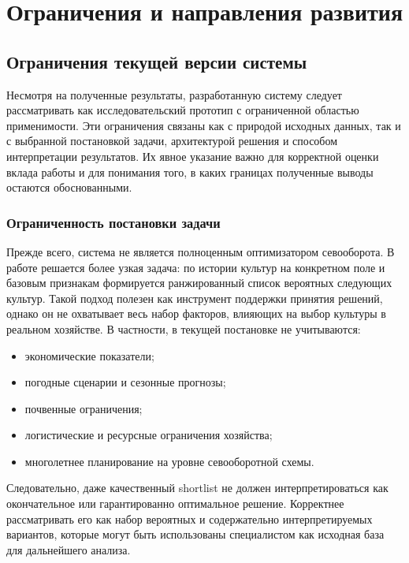 \section{Ограничения и направления развития}

\subsection{Ограничения текущей версии системы}

Несмотря на полученные результаты, разработанную систему следует рассматривать как исследовательский прототип с
ограниченной областью применимости. Эти ограничения связаны как с природой исходных данных, так и с выбранной
постановкой задачи, архитектурой решения и способом интерпретации результатов. Их явное указание важно для корректной
оценки вклада работы и для понимания того, в каких границах полученные выводы остаются обоснованными.

\subsubsection{Ограниченность постановки задачи}

Прежде всего, система не является полноценным оптимизатором севооборота. В работе решается более узкая задача: по
истории культур на конкретном поле и базовым признакам формируется ранжированный список вероятных следующих культур.
Такой подход полезен как инструмент поддержки принятия решений, однако он не охватывает весь набор факторов, влияющих на
выбор культуры в реальном хозяйстве. В частности, в текущей постановке не учитываются:

\begin{itemize}
\tightlist
\item
  экономические показатели;
\item
  погодные сценарии и сезонные прогнозы;
\item
  почвенные ограничения;
\item
  логистические и ресурсные ограничения хозяйства;
\item
  многолетнее планирование на уровне севооборотной схемы.
\end{itemize}

Следовательно, даже качественный shortlist не должен интерпретироваться как окончательное или гарантированно оптимальное
решение. Корректнее рассматривать его как набор вероятных и содержательно интерпретируемых вариантов, которые могут быть
использованы специалистом как исходная база для дальнейшего анализа.

